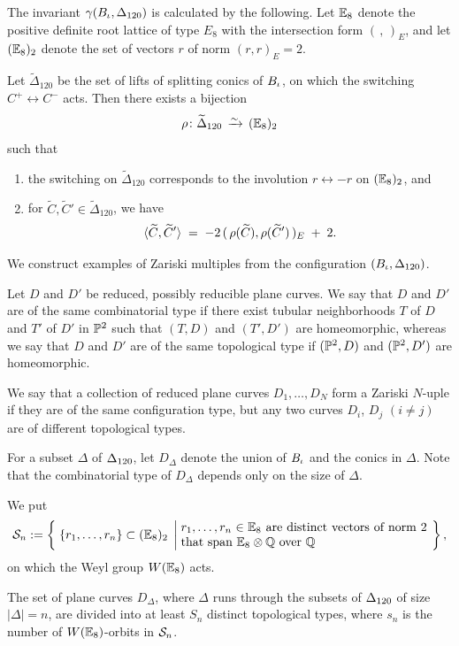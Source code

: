 \documentclass{amsart} %
\begin{document}
%
The invariant $\gamma(B_{\iota}, \Delta_{120})$ is calculated by the 
following.
Let $\mathord{\mathbb{E}}_8$ denote the positive definite root lattice
of type $E_8$ with the intersection form
$(\, , \,)_{E}$,
and let $(\mathord{\mathbb{E}}_{8})_2$ denote the set of vectors
$r$ of norm $(r, r)_{E}=2$.
%
\begin{proposition}
Let $\widetilde{\Delta}_{120}$
be the set of lifts of splitting conics of $B_{\iota}$,
on which the switching $C^+ \leftrightarrow C^-$ acts.
Then there exists a bijection
\[
\rho \colon \widetilde{\Delta}_{120}
\,\isom\,   (\EE_{8})_2
\]
such that 
%
\begin{enumerate}[label={\rm(\roman*)}]
\item  the switching on
$\widetilde{\Delta}_{120}$
corresponds to the involution  $r \leftrightarrow -r$
on $(\mathord{\mathbb{E}}_{8})_2$,
and
\item 
for
$\widetilde{C}, \widetilde{C}' \in \widetilde{\Delta}_{120}$,
we have
\[
\langle \widetilde{C}, \widetilde{C}' \rangle
\;=\;
-2\,(\,\rho(\widetilde{C}),\rho(\widetilde{C}')\, )_E \;+\; 2.
\]
\end{enumerate}
\end{proposition}
%
We construct examples of Zariski multiples
from the configuration $(B_{\iota}, \Delta_{120})$.
%
\begin{definition}
Let $D$ and $D'$ be reduced, possibly reducible plane curves.
We say that $D$ and $D'$ are of the same combinatorial type
if there exist tubular neighborhoods $T$ of $D$
and $T'$ of $D'$ in $\mathord{\mathbb{P}}^2$
such that $(T, D)$ and $(T', D')$ are homeomorphic,
whereas 
we say that $D$ and $D'$ are of the same topological type
if $(\mathord{\mathbb{P}}^2,D)$ and $(\mathord{\mathbb{P}}^2,D')$ are homeomorphic.
\par
We say that a collection of reduced plane curves
$D_1,\ldots,D_N$ form a Zariski $N$-uple
if they are of the same configuration type,
but any two curves $D_i$, $D_j$ $(i \neq j)$
are of different topological types.
\end{definition}
%
For a subset $\Delta$ of $\Delta_{120}$,
let $D_\Delta$ denote the union of $B_{\iota}$
and the conics in $\Delta$.
Note that the combinatorial type of $D_\Delta$
depends only on the size of $\Delta$.
%
\par
%
We put
\[
\SSS_n:=\bigset{\{r_1, \dots, r_n\}\subset (\EE_8)_2}%
{\parbox{7cm}{$r_1, \dots, r_n\in \EE_8$ 
are distinct vectors of norm $2$
that span $\EE_8\tensor\QQ$ over $\QQ$}},
\]
on which the Weyl group $W(\mathord{\mathbb{E}}_8)$ acts.
%
\begin{theorem}
The set of plane curves $D_\Delta$,
where $\Delta$ runs through the subsets of $\Delta_{120}$
of size $|\Delta|=n$, are divided into at least $S_n$
distinct topological types,
where  $s_n$ is 
the number  of $W(\mathord{\mathbb{E}}_8)$-orbits in $\mathord{\mathcal{S}}_n$. 
\end{theorem}
\end{document}
